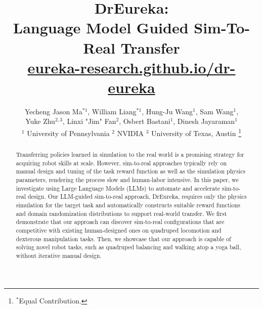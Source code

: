 \documentclass[conference]{IEEEtran}
\newcommand{\website}{\href{https://eureka-research.github.io/dr-eureka}{eureka-research.github.io/dr-eureka}}
\begin{document}
\title{DrEureka: \\ Language Model Guided Sim-To-Real Transfer\\[0.1cm]\large\website
\vspace{-0.5cm}}


\author{Yecheng Jason Ma$^{*1}$, William Liang$^{*1}$, Hung-Ju Wang$^{1}$, Sam Wang$^{1}$, \\Yuke Zhu$^{2,3}$, Linxi "Jim" Fan$^{2}$, Osbert Bastani$^{1}$, Dinesh Jayaraman$^{1}$
\\[1.0ex]
$^1$ University of Pennsylvania \quad\quad\quad $^2$ NVIDIA \quad\quad\quad $^3$ University of Texas, Austin
\thanks{$^*$Equal Contribution.}%
\\[-4.0ex]
}


\newcommand{\ourmethod}{\texttt{DrEureka}\xspace}
\newcommand{\jason}[1]{\textcolor{black}{#1}}
\newcommand{\jim}[1]{\textcolor{red}{Jim: #1}}
\newcommand{\yuke}[1]{\textcolor{blue}{Yuke: #1}}
\newcommand{\johnny}[1]{\textcolor{orange}{#1}}
\newcommand{\will}[1]{\textcolor{blue}{#1}}
\newcommand{\sam}[1]{\textcolor{black}{#1}}

\newcommand{\newtext}[1]{\textcolor{black}{#1}}
\newcommand{\arxiv}[1]{\textcolor{black}{#1}}







\maketitle

\begin{abstract}
Transferring policies learned in simulation to the real world is a promising strategy for acquiring robot skills at scale. However, sim-to-real approaches typically rely on manual design and tuning of the task reward function as well as the simulation physics parameters, rendering the process slow and human-labor intensive. In this paper, we investigate using Large Language Models (LLMs) to automate and accelerate sim-to-real design. Our LLM-guided sim-to-real approach, DrEureka, requires only the physics simulation for the target task and automatically constructs suitable reward functions and domain randomization distributions to support real-world transfer. We first demonstrate that our approach can discover sim-to-real configurations that are competitive with existing human-designed ones on quadruped locomotion and dexterous manipulation tasks. Then, we showcase that our approach is capable of solving novel robot tasks, such as quadruped balancing and walking atop a yoga ball, without iterative manual design.

\end{abstract}
\end{document}
